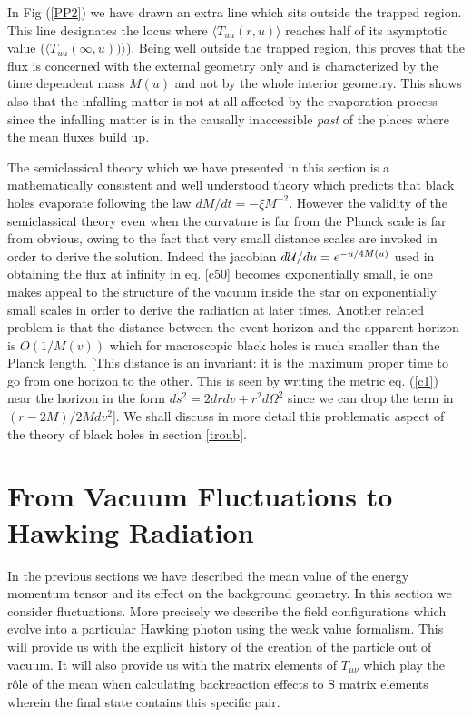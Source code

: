 \documentclass[12pt,oneside]{report}
\begin{document}
In Fig (\ref{PP2})
we have drawn an extra line which sits outside the trapped region.
This line designates the locus where $\langle
T_{uu}(r,u) \rangle$ reaches half of its asymptotic
value\break
 ($\langle T_{uu}(\infty,u)) \rangle$). 
Being well outside the trapped region, this proves that the flux 
is concerned with the external geometry only and is characterized
by the time dependent mass $M(u)$ and not by 
the whole interior geometry. This shows also
that the infalling matter is not at all affected by the evaporation process
since the infalling matter is in the causally inaccessible {\it{past}}
of the places
where the mean fluxes build up. 


The semiclassical theory which we have presented in this section is a
mathematically consistent and well understood theory which predicts that
black holes evaporate following the law $dM/dt = -\xi M^{-2}$. However the
validity of the semiclassical theory even when the curvature is far from the
Planck scale is far from obvious, owing to the fact that very small distance
scales are invoked in order to derive the solution. Indeed the
jacobian $d{\cal U} / du = e^{-u/ 4 M(u)}$ used in obtaining the flux
at infinity in eq. \ref{c50} becomes exponentially small, ie one makes appeal
to the structure of the vacuum inside the star on exponentially small scales in
order to derive the radiation at later times. Another related problem is
that the distance between the event horizon and the apparent horizon is
$O(1/M(v))$ which for  macroscopic black holes is much smaller than the Planck
length.  [This distance is an invariant: it is the 
maximum proper time to go from one horizon to
the other. This is seen by writing the metric 
eq. (\ref{c1}) near the horizon in the form $ds^2=
2drdv+r^2d\Omega^2$ since we can drop
the term in 
$(r-2M)/ 2M dv^2$]. We shall discuss in more detail this problematic aspect
of the theory of black holes in section \ref{troub}.



\section{From Vacuum Fluctuations  
to Hawking Radiation}
\label{VFHR}

In the previous sections we have described the mean 
value of the energy momentum tensor and its effect on the
background geometry.  In this section we consider 
fluctuations. More precisely we
describe the  field configurations which evolve into a
particular Hawking photon using the
weak value formalism. This will provide us with the explicit history 
of  the creation of the particle out of vacuum. It will also provide us with the matrix
elements of $T_{\mu\nu}$ which play the r\^ole of the mean when calculating backreaction
effects to S matrix elements wherein the final state contains this specific pair.
\end{document}
